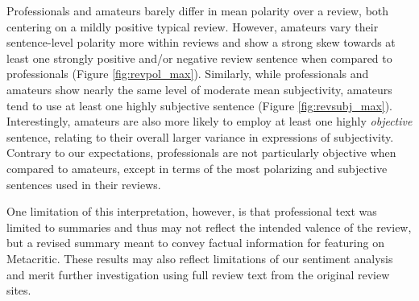 \documentclass{sig-alternate}
\begin{document}
Professionals and amateurs barely differ in mean polarity over a review, both centering on a mildly positive typical review. However, amateurs vary their sentence-level polarity more within reviews and show a strong skew towards at least one strongly positive and/or negative review sentence when compared to professionals (Figure \ref{fig:revpol_max}). Similarly, while professionals and amateurs show nearly the same level of moderate mean subjectivity, amateurs tend to use at least one highly subjective sentence (Figure \ref{fig:revsubj_max}). Interestingly, amateurs are also more likely to employ at least one highly \textit{objective} sentence, relating to their overall larger variance in expressions of subjectivity. Contrary to our expectations, professionals are not particularly objective when compared to amateurs, except in terms of the most polarizing and subjective sentences used in their reviews.

One limitation of this interpretation, however, is that professional
text was limited to summaries and thus may not reflect the intended valence of the review, but a revised summary meant to convey factual information for featuring on Metacritic. These results may also reflect limitations of our sentiment analysis and merit further investigation using full review text from the original review sites.
\end{document}
